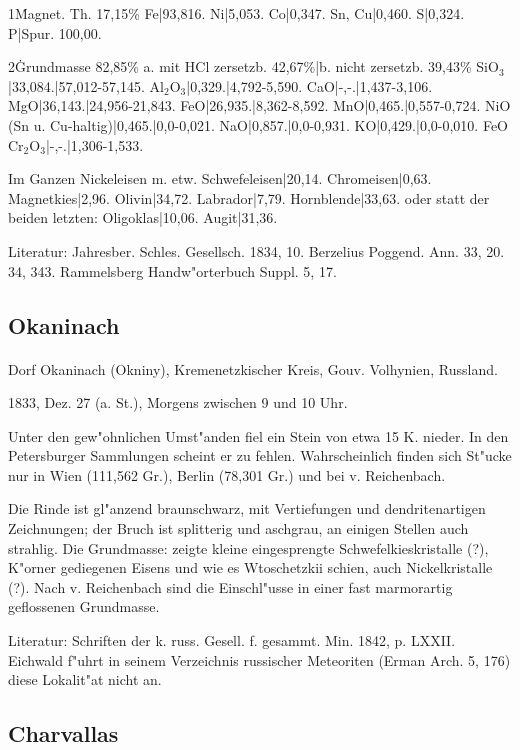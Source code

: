 \documentclass[a4paper, 11pt, oneside]{article}
\begin{document}
1\. Magnet. Th. 17,15\%  
Fe|93,816.  
Ni|5,053.  
Co|0,347.  
Sn, Cu|0,460.  
S|0,324.  
P|Spur.  
100,00.

2\. Grundmasse 82,85\%  
a. mit HCl zersetzb. 42,67\%|b. nicht zersetzb. 39,43\%  
SiO$_{3}$|33,084.|57,012-57,145.  
Al$_{2}$O$_{3}$|0,329.|4,792-5,590.  
CaO|-,-.|1,437-3,106.  
MgO|36,143.|24,956-21,843.
FeO|26,935.|8,362-8,592.
MnO|0,465.|0,557-0,724.  
NiO (Sn u. Cu-haltig)|0,465.|0,0-0,021.  
NaO|0,857.|0,0-0,931.  
KO|0,429.|0,0-0,010.  
FeO Cr$_{2}$O$_{3}$|-,-.|1,306-1,533.

Im Ganzen  
Nickeleisen m. etw. Schwefeleisen|20,14.  
Chromeisen|0,63.  
Magnetkies|2,96.  
Olivin|34,72.  
Labrador|7,79.  
Hornblende|33,63.  
oder statt der beiden letzten:  
Oligoklas|10,06.  
Augit|31,36.

\footnotesize
Literatur: Jahresber. Schles. Gesellsch. 1834, 10. Berzelius Poggend. Ann. 33, 20. 34, 343. Rammelsberg Handw"orterbuch Suppl. 5, 17.

\subsection{Okaninach}
\normalsize
\paragraph{}
Dorf Okaninach (Okniny), Kremenetzkischer Kreis, Gouv. Volhynien, Russland.

1833, Dez. 27 (a. St.), Morgens zwischen 9 und 10 Uhr.

Unter den gew"ohnlichen Umst"anden fiel ein Stein von etwa 15 K. nieder. In den Petersburger Sammlungen scheint er zu fehlen. Wahrscheinlich finden sich St"ucke nur in Wien (111,562 Gr.), Berlin (78,301 Gr.) und bei v. Reichenbach.

Die Rinde ist gl"anzend braunschwarz, mit Vertiefungen und dendritenartigen Zeichnungen; der Bruch ist splitterig und aschgrau, an einigen Stellen auch strahlig. Die Grundmasse: zeigte kleine eingesprengte Schwefelkieskristalle (?), K"orner gediegenen Eisens und wie es Wtoschetzkii schien, auch Nickelkristalle (?). Nach v. Reichenbach sind die Einschl"usse in einer fast marmorartig geflossenen Grundmasse.

\footnotesize
Literatur: Schriften der k. russ. Gesell. f. gesammt. Min. 1842, p. LXXII. Eichwald f"uhrt in seinem Verzeichnis russischer Meteoriten (Erman Arch. 5, 176) diese Lokalit"at nicht an.

\subsection{Charvallas}
\normalsize
\end{document}

